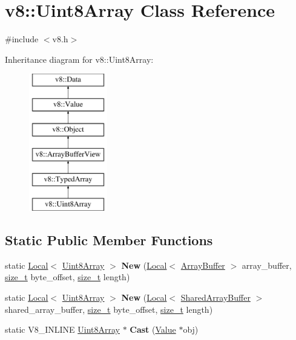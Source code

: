 \hypertarget{classv8_1_1Uint8Array}{}\section{v8\+:\+:Uint8\+Array Class Reference}
\label{classv8_1_1Uint8Array}


{\ttfamily \#include $<$v8.\+h$>$}

Inheritance diagram for v8\+:\+:Uint8\+Array\+:\begin{figure}[H]
\begin{center}
\leavevmode
\includegraphics[height=6.000000cm]{classv8_1_1Uint8Array}
\end{center}
\end{figure}
\subsection*{Static Public Member Functions}
\begin{DoxyCompactItemize}
\item 
\mbox{\label{classv8_1_1Uint8Array_a8262a637cc67c57669adcf5a18bcd29a}} 
static \mbox{\hyperlink{classv8_1_1Local}{Local}}$<$ \mbox{\hyperlink{classv8_1_1Uint8Array}{Uint8\+Array}} $>$ {\bfseries New} (\mbox{\hyperlink{classv8_1_1Local}{Local}}$<$ \mbox{\hyperlink{classv8_1_1ArrayBuffer}{Array\+Buffer}} $>$ array\+\_\+buffer, \mbox{\hyperlink{classsize__t}{size\+\_\+t}} byte\+\_\+offset, \mbox{\hyperlink{classsize__t}{size\+\_\+t}} length)
\item 
\mbox{\label{classv8_1_1Uint8Array_a07d1f8e3377ddb6af3b423ed0d0f5d26}} 
static \mbox{\hyperlink{classv8_1_1Local}{Local}}$<$ \mbox{\hyperlink{classv8_1_1Uint8Array}{Uint8\+Array}} $>$ {\bfseries New} (\mbox{\hyperlink{classv8_1_1Local}{Local}}$<$ \mbox{\hyperlink{classv8_1_1SharedArrayBuffer}{Shared\+Array\+Buffer}} $>$ shared\+\_\+array\+\_\+buffer, \mbox{\hyperlink{classsize__t}{size\+\_\+t}} byte\+\_\+offset, \mbox{\hyperlink{classsize__t}{size\+\_\+t}} length)
\item 
\mbox{\label{classv8_1_1Uint8Array_a3bf7e458abe0be9bc943ba2de6c4f432}} 
static V8\+\_\+\+I\+N\+L\+I\+NE \mbox{\hyperlink{classv8_1_1Uint8Array}{Uint8\+Array}} $\ast$ {\bfseries Cast} (\mbox{\hyperlink{classv8_1_1Value}{Value}} $\ast$obj)
\end{DoxyCompactItemize}

